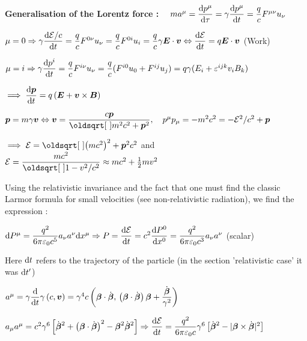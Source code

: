 \item[] \textbf{Generalisation of the Lorentz force :} $\quad ma^{\mu} = \dfrac{\textrm{d} p^\mu}{\textrm{d} \tau} = \gamma\dfrac{\textrm{d} p^\mu}{\textrm{d} t} = \dfrac{q}{c} F^{\mu\nu}u_{\nu}$

\item $\mu = 0 \Rightarrow \gamma\dfrac{\ud \E/c}{\ud t} = \dfrac{q}{c} F^{0\nu}u_{\nu}= \dfrac{q}{c} F^{0i}u_{i} = \dfrac{q}{c}\gamma\Vec{E}\cdot\Vec{v} \Leftrightarrow \dfrac{\ud \E}{\ud t}= q\Vec{E}\cdot\Vec{v}$ \quad (Work)  

\item $\mu = i \Rightarrow \gamma\dfrac{\textrm{d} p^i}{\textrm{d} t} = \dfrac{q}{c} F^{i\nu}u_{\nu} = \dfrac{q}{c} (F^{i0}u_{0} +F^{ij}u_{j})= q\gamma(E_i + \varepsilon^{ijk}v_iB_k)$

$ \implies \dfrac{\ud \Vec{p} }{\ud t}  = q\left(\vec{E} + \vec{v} \times \vec{B} \right)$


\item $\vec{p} = m\gamma\vec{v} \Leftrightarrow \vec{v} = \dfrac{c\vec{p}}{\sqrt{m^2c^2 + \vec{p}^2}}, \quad p^{\mu}p_{\mu} = -m^2c^2 = -\E^2/c^2 +\Vec{p}$

$ \implies \E = \sqrt{\left(mc^2\right)^2 + \vec{p}^2c^2}$ \quad and \quad $\E = \dfrac{mc^2}{\sqrt{1-v^2/c^2}} \approx mc^2 + \half mv^2$  

\squishend
{}
\squishlist
\item[] Using the relativistic invariance and the fact that one must find the classic Larmor formula for small velocities (see non-relativistic radiation), we find the expression :

\item $\textrm{d} P^{\mu } =  \dfrac{q^2}{6\pi \varepsilon_0 c^5}a_{\nu}a^{\nu} \textrm{d} x^{\mu} \Rightarrow P = \dfrac{\textrm{d} \mathcal{E}}{\textrm{d} t} = c^2 \dfrac{\textrm{d} P^0}{\textrm{d} x^0} = \dfrac{q^2}{6\pi\varepsilon_0c^3} a_{\nu}a^{\nu}$ (scalar)

\item Here $\textrm{d} t$ refers to the trajectory of the particle (in the section 'relativistic case' it was $\textrm{d} t'$)

\item $a^{\mu} = \gamma \dfrac{\textrm{d}}{\textrm{d} t} \gamma \left(c, \mbox{\boldmath$v$}\right) = \gamma^4 c \left(\mbox{\boldmath$\beta$}\cdot\dot{\mbox{\boldmath$\beta$}}, \, \left(\mbox{\boldmath$\beta$}\cdot\dot{\mbox{\boldmath$\beta$}}\right)\mbox{\boldmath$\beta$} + \dfrac{\dot{\mbox{\boldmath$\beta$}}}{\gamma^2}\right)$

\item $a_{\mu}a^{\mu} = c^2\gamma^6 \left[ \dot{\mbox{\boldmath$\beta$}}^2 + \left(\mbox{\boldmath$\beta$}\cdot\dot{\mbox{\boldmath$\beta$}}\right)^2 -\mbox{\boldmath$\beta$}^2 \dot{\mbox{\boldmath$\beta$}}^2   \right] \Rightarrow \dfrac{\textrm{d} \mathcal{E}}{\textrm{d} t} = \dfrac{q^2}{6\pi\varepsilon_0c}\gamma^6 \left[\dot{\mbox{\boldmath$\beta$}}^2 - |\mbox{\boldmath$\beta$} \times \dot{\mbox{\boldmath$\beta$}}|^2\right]$

